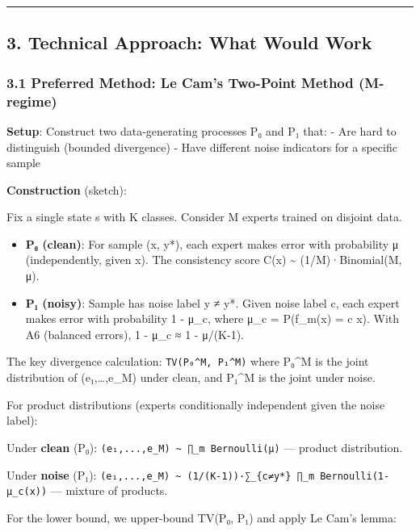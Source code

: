 \documentclass[
  12pt,
]{ctexart}
\providecommand{\tightlist}{%
  \setlength{\itemsep}{0pt}\setlength{\parskip}{0pt}}
\begin{document}
\begin{center}\rule{0.5\linewidth}{0.5pt}\end{center}

\subsection{3. Technical Approach: What Would
Work}\label{technical-approach-what-would-work}

\subsubsection{3.1 Preferred Method: Le Cam's Two-Point Method
(M-regime)}\label{preferred-method-le-cams-two-point-method-m-regime}

\textbf{Setup}: Construct two data-generating processes P₀ and P₁ that:
- Are hard to distinguish (bounded divergence) - Have different noise
indicators for a specific sample

\textbf{Construction} (sketch):

Fix a single state s with K classes. Consider M experts trained on
disjoint data.

\begin{itemize}
\tightlist
\item
  \textbf{P₀ (clean)}: For sample (x, y*), each expert makes error with
  probability μ (independently, given x). The consistency score C(x)
  \textasciitilde{} (1/M)·Binomial(M, μ).
\item
  \textbf{P₁ (noisy)}: Sample has noise label y ≠ y*. Given noise label
  c, each expert makes error with probability 1 - μ\_c, where μ\_c =
  P(f\_m(x) = c \textbar{} x). With A6 (balanced errors), 1 - μ\_c ≈ 1 -
  μ/(K-1).
\end{itemize}

The key divergence calculation: \texttt{TV(P₀\^{}M,\ P₁\^{}M)} where
P₀\^{}M is the joint distribution of (e₁,\ldots,e\_M) under clean, and
P₁\^{}M is the joint under noise.

For product distributions (experts conditionally independent given the
noise label):

Under \textbf{clean} (P₀):
\texttt{(e₁,...,e\_M)\ \textasciitilde{}\ ∏\_m\ Bernoulli(μ)} ---
product distribution.

Under \textbf{noise} (P₁):
\texttt{(e₁,...,e\_M)\ \textasciitilde{}\ (1/(K-1))·∑\_\{c≠y*\}\ ∏\_m\ Bernoulli(1-μ\_c(x))}
--- mixture of products.

For the lower bound, we upper-bound TV(P₀, P₁) and apply Le Cam's lemma:
\end{document}
